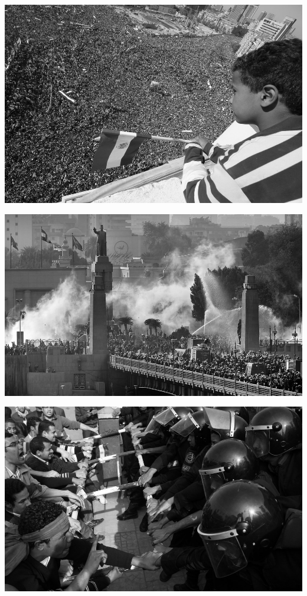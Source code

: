 \documentclass[a4paper,12pt]{minimal}
\begin{document}
\includegraphics[angle=90, width=\textwidth]{images/arabspring1}

\includegraphics[angle=90, width=\textwidth]{images/arabspring2}

\includegraphics[angle=90, width=\textwidth]{images/arabspring3}
\end{document}
